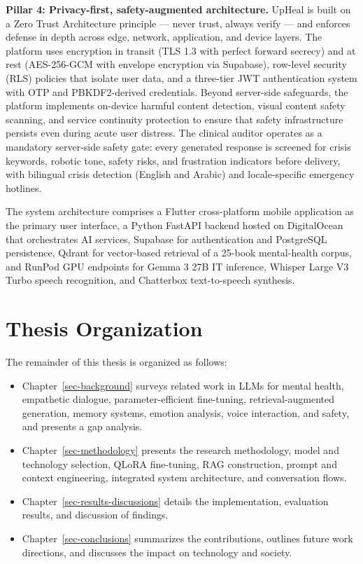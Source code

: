 \documentclass[
  letterpaper,
  12pt,
  a4paper,
  openany]{report}
\providecommand{\tightlist}{%
  \setlength{\itemsep}{0pt}\setlength{\parskip}{0pt}}
\begin{document}
\textbf{Pillar 4: Privacy-first, safety-augmented architecture.} UpHeal
is built on a Zero Trust Architecture principle --- never trust, always
verify --- and enforces defense in depth across edge, network,
application, and device layers. The platform uses encryption in transit
(TLS 1.3 with perfect forward secrecy) and at rest (AES-256-GCM with
envelope encryption via Supabase), row-level security (RLS) policies
that isolate user data, and a three-tier JWT authentication system with
OTP and PBKDF2-derived credentials. Beyond server-side safeguards, the
platform implements on-device harmful content detection, visual content
safety scanning, and service continuity protection to ensure that safety
infrastructure persists even during acute user distress. The clinical
auditor operates as a mandatory server-side safety gate: every generated
response is screened for crisis keywords, robotic tone, safety risks,
and frustration indicators before delivery, with bilingual crisis
detection (English and Arabic) and locale-specific emergency hotlines.

The system architecture comprises a Flutter cross-platform mobile
application as the primary user interface, a Python FastAPI backend
hosted on DigitalOcean that orchestrates AI services, Supabase for
authentication and PostgreSQL persistence, Qdrant for vector-based
retrieval of a 25-book mental-health corpus, and RunPod GPU endpoints
for Gemma 3 27B IT inference, Whisper Large V3 Turbo speech recognition,
and Chatterbox text-to-speech synthesis.

\section{Thesis Organization}\label{sec-thesis-organization}

The remainder of this thesis is organized as follows:

\begin{itemize}
\tightlist
\item
  Chapter~\ref{sec-background} surveys related work in LLMs for mental
  health, empathetic dialogue, parameter-efficient fine-tuning,
  retrieval-augmented generation, memory systems, emotion analysis,
  voice interaction, and safety, and presents a gap analysis.
\item
  Chapter~\ref{sec-methodology} presents the research methodology, model
  and technology selection, QLoRA fine-tuning, RAG construction, prompt
  and context engineering, integrated system architecture, and
  conversation flows.
\item
  Chapter~\ref{sec-results-discussions} details the implementation,
  evaluation results, and discussion of findings.
\item
  Chapter~\ref{sec-conclusions} summarizes the contributions, outlines
  future work directions, and discusses the impact on technology and
  society.
\end{itemize}
\end{document}
